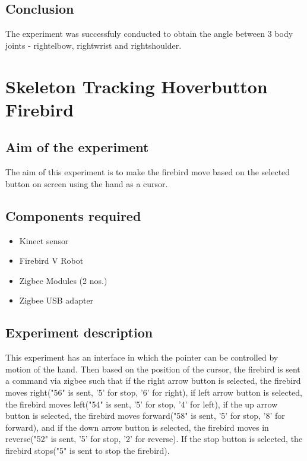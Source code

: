 \begin{flushleft}
\subsection{\textbf{ Conclusion}}
 The experiment was successfuly conducted to obtain the angle between 3 body joints - rightelbow, rightwrist and rightshoulder.
\medskip
\newpage

\section{\textbf{ Skeleton Tracking Hoverbutton Firebird}}
\label{4.8}

\medskip
\subsection{\textbf{ Aim of the experiment}}
The aim of this experiment is to make the firebird move based on the selected button on screen using the hand as a cursor.
\medskip

\subsection{\textbf{ Components required}}
\begin{itemize}
\item Kinect sensor
\item Firebird V Robot
\item Zigbee Modules (2 nos.)
\item Zigbee USB adapter
\end{itemize}
\medskip

\subsection{\textbf{ Experiment description}}
This experiment has an interface in which the pointer can be controlled by motion of the hand. Then based on the position of the cursor, the firebird is sent a command via zigbee such that if the right arrow button is selected, the firebird moves right("56" is sent, '5' for stop, '6' for right), if left arrow button is selected, the firebird moves left("54" is sent, '5' for stop, '4' for left), if the up arrow button is selected, the firebird moves forward("58" is sent, '5' for stop, '8' for forward), and if the down arrow button is selected, the firebird moves in reverse("52" is sent, '5' for stop, '2' for reverse). If the stop button is selected, the firebird stops("5" is sent to stop the firebird).


\end{flushleft}
